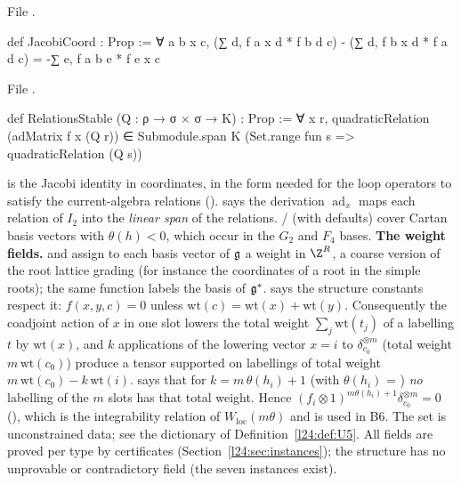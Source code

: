 \noindent File .
\begin{leancode}
def JacobiCoord : Prop :=
  ∀ a b x c, (∑ d, f a x d * f b d c) - (∑ d, f b x d * f a d c) = -∑ e, f a b e * f e x c
\end{leancode}
\noindent File .
\begin{leancode}
def RelationsStable (Q : ρ → σ × σ → K) : Prop :=
  ∀ x r, quadraticRelation (adMatrix f x (Q r)) ∈
    Submodule.span K (Set.range fun s => quadraticRelation (Q s))
\end{leancode}

\begin{dictionary}
 is the Jacobi identity in coordinates, in the form needed for the loop operators to satisfy
the current-algebra relations ().  says the derivation $\operatorname{ad}_x$
maps each relation of $I_2$ into the \emph{linear span} of the relations. / (with
defaults) cover Cartan basis vectors with $\theta(h)<0$, which occur in the $G_2$ and $F_4$ bases.
\textbf{The weight fields.}  and  assign to each basis vector of $\mathfrak g$ a weight in
$\Z^R$, a coarse version of the root lattice grading (for instance the coordinates of a root in the simple roots); the
same function labels the basis of $\mathfrak g^*$.  says the structure constants respect it:
$f(x,y,c)=0$ unless $\mathrm{wt}(c)=\mathrm{wt}(x)+\mathrm{wt}(y)$. Consequently the coadjoint action of $x$ in one slot
lowers the total weight $\sum_j\mathrm{wt}(t_j)$ of a labelling $t$ by $\mathrm{wt}(x)$, and $k$ applications of the
lowering vector $x=i$ to $\delta_{c_0}^{\otimes m}$ (total weight $m\,\mathrm{wt}(c_0)$) produce a tensor supported on labellings of
total weight $m\,\mathrm{wt}(c_0)-k\,\mathrm{wt}(i)$.  says that for $k=m\,\theta(h_i)+1$ (with
$\theta(h_i)$ = ) \emph{no} labelling of the $m$ slots has that total weight. Hence
$(f_i\otimes1)^{m\theta(h_i)+1}\delta_{c_0}^{\otimes m}=0$ (), which is the integrability relation of
$W_{\mathrm{loc}}(m\theta)$ and is used in B6. The  set is unconstrained data; see the dictionary of
Definition~\ref{l24:def:U5}. All fields are proved per type by certificates (Section~\ref{l24:sec:instances}); the
structure has no unprovable or contradictory field (the seven instances exist).
\end{dictionary}

